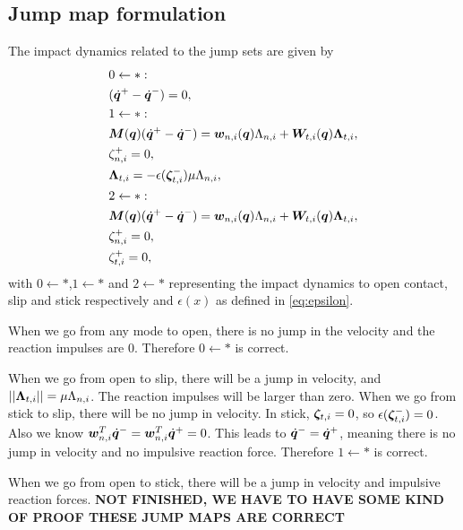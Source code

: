 \documentclass[DC2017114Bouma.tex]{subfiles}
\begin{document}
\subsection{Jump map formulation}\label{sec:derivation}
The impact dynamics related to the jump sets are given by
\begin{align}
&0\leftarrow \ast:\nonumber\\
&(\dot{{\boldsymbol{q}}}^+ - \dot{{\boldsymbol{q}}}^-) = 0,\label{eq:appjump1}\\
&1\leftarrow\ast:\nonumber\\
&{\boldsymbol{M}}({\boldsymbol{q}})(\dot{{\boldsymbol{q}}}^+ - \dot{{\boldsymbol{q}}}^-) = {\boldsymbol{w}}_{n,i}({\boldsymbol{q}})\Lambda_{n,i} + {\boldsymbol{W}}_{t,i}({\boldsymbol{q}})\boldsymbol{\Lambda}_{t,i},\label{eq:appjump2}\\
&\zeta_{n,i}^+=0,\label{eq:appjump3}\\
&\boldsymbol{\Lambda}_{t,i} = -\epsilon(\boldsymbol{\zeta}^-_{t,i})\mu\Lambda_{n,i},\label{eq:appjump4}\\
&2\leftarrow \ast:\nonumber\\
&{\boldsymbol{M}}({\boldsymbol{q}})(\dot{{\boldsymbol{q}}}^+ - \dot{{\boldsymbol{q}}}^-) = {\boldsymbol{w}}_{n,i}({\boldsymbol{q}})\Lambda_{n,i} + {\boldsymbol{W}}_{t,i}({\boldsymbol{q}})\boldsymbol{\Lambda}_{t,i},\label{eq:appjump5}\\
&\zeta_{n,i}^+=0,\label{eq:appjump6}\\
&\zeta_{t,i}^+= 0,\label{eq:appjump7}
\end{align}
with $0\leftarrow\ast$,$1\leftarrow\ast$ and $2\leftarrow\ast$ representing the impact dynamics to open contact, slip and stick respectively and $\epsilon(x)$ as defined in \eqref{eq:epsilon}. 

When we go from any mode to open, there is no jump in the velocity and the reaction impulses are 0. Therefore $0\leftarrow \ast$ is correct.

When we go from open to slip, there will be a jump in velocity, and $||\boldsymbol{\Lambda}_{t,i}|| = \mu\Lambda_{n,i}$. The reaction impulses will be larger than zero. When we go from stick to slip, there will be no jump in velocity. In stick, $\boldsymbol{\zeta}_{t,i} =0$, so $\epsilon(\boldsymbol{\zeta}^-_{t,i}) = 0$. Also we know ${\boldsymbol{w}}_{n,i}^T\dot{{\boldsymbol{q}}}^- = {\boldsymbol{w}}_{n,i}^T\dot{{\boldsymbol{q}}}^+ = 0 $. This leads to $\dot{{\boldsymbol{q}}}^- = \dot{{\boldsymbol{q}}}^+$, meaning there is no jump in velocity and no impulsive reaction force. Therefore $1\leftarrow \ast$ is correct.

When we go from open to stick, there will be a jump in velocity and impulsive reaction forces.
\textbf{NOT FINISHED, WE HAVE TO HAVE SOME KIND OF PROOF THESE JUMP MAPS ARE CORRECT}
\end{document}
